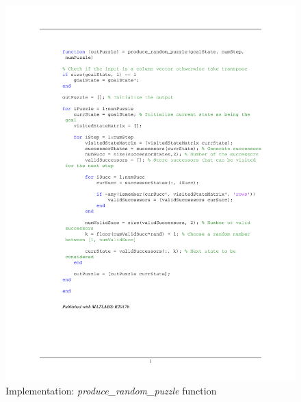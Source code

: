 \documentclass[12pt]{article}
\begin{document}
\begin{figure}[htb]
	\centering
	\includegraphics[width=1\columnwidth]{images/Code_produce_random_puzzle.pdf}
	\caption{Implementation: \textit{produce\_random\_puzzle} function}
	\label{}
\end{figure}

%
%
\end{document}
